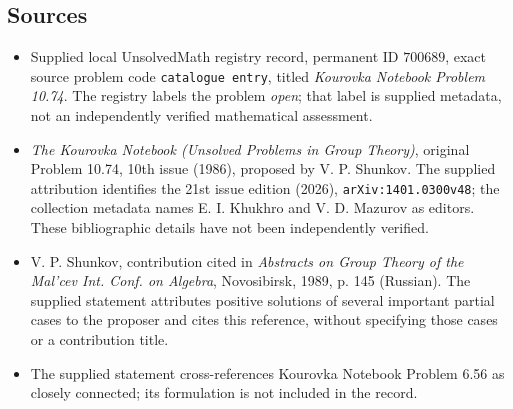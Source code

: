 \documentclass[11pt]{article}
\begin{document}
\subsection{Sources}
\begin{itemize}
\item Supplied local UnsolvedMath registry record, permanent ID \(700689\), exact source problem code \texttt{catalogue entry}, titled \emph{Kourovka Notebook Problem 10.74}. The registry labels the problem \emph{open}; that label is supplied metadata, not an independently verified mathematical assessment.
\item \emph{The Kourovka Notebook (Unsolved Problems in Group Theory)}, original Problem 10.74, 10th issue (1986), proposed by V. P. Shunkov. The supplied attribution identifies the 21st issue edition (2026), \texttt{arXiv:1401.0300v48}; the collection metadata names E. I. Khukhro and V. D. Mazurov as editors. These bibliographic details have not been independently verified.
\item V. P. Shunkov, contribution cited in \emph{Abstracts on Group Theory of the Mal'cev Int. Conf. on Algebra}, Novosibirsk, 1989, p. 145 (Russian). The supplied statement attributes positive solutions of several important partial cases to the proposer and cites this reference, without specifying those cases or a contribution title.
\item The supplied statement cross-references Kourovka Notebook Problem 6.56 as closely connected; its formulation is not included in the record.
\end{itemize}
\end{document}
